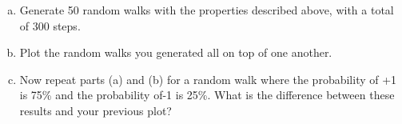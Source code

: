 \documentclass[11pt]{article}
\begin{document}
\begin{enumerate}[a.]
    \item  Generate 50 random walks with the properties described above, with
    a total of 300 steps.
    
    \item  Plot the random walks you generated all on top of one another.
    
    \item  Now repeat parts (a) and (b) for a random walk where the
    probability of +1 is 75\% and the probability of-1 is 25\%.
    What is the difference between these results and your previous plot?
\end{enumerate}
\end{document}
